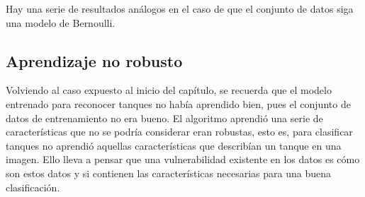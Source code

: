 Hay una serie de resultados análogos en el caso de que el conjunto de datos siga una modelo de Bernoulli.




\subsection{Aprendizaje no robusto}

Volviendo al caso expuesto al inicio del capítulo, se recuerda que el modelo entrenado para reconocer tanques no había aprendido bien, pues el conjunto de datos de entrenamiento no era bueno. El algoritmo aprendió una serie de características que no se podría considerar eran robustas, esto es, para clasificar tanques no aprendió aquellas características que describían un tanque en una imagen. Ello lleva a pensar que una vulnerabilidad existente en los datos es cómo son estos datos y si contienen las características necesarias para una buena clasificación.

